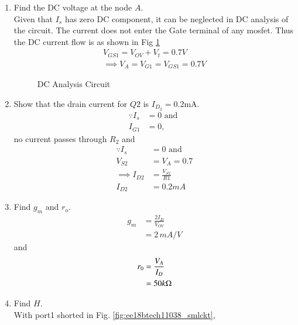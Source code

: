 \begin{enumerate}[label=\arabic*.,ref=\theenumi]
\renewcommand{\thefigure}{\theenumi.\arabic{figure}}
\item Find the DC voltage at the node $A$.
\\
\solution 
Given that $I_{s}$ has zero DC component, it can be neglected in DC analysis of the circuit. The current does not enter the Gate terminal of any mosfet. Thus the DC current flow is as shown in Fig \ref{fig:ee18btech11038_dcckt} 
\begin{align}
    V_{GS1} = V_{OV}  + V_{t} = 0.7V\\
    \implies V_A = V_{G1} = V_{GS1} = 0.7V
    \end{align}
\begin{figure}[!ht]
	\begin{center}
		
		\resizebox{\columnwidth}{!}{}
	\end{center}
\caption{DC Analysis Circuit}
\label{fig:ee18btech11038_dcckt}
\end{figure}
%
\item Show that the drain current for $Q2$ is $I_{D_2} = 0.2$mA.
\\
\solution 
\begin{align}
\because I_s &= 0 \text{ and }
\\
I_{G1} &= 0,
\end{align}
no current passes through $R_2$ and
%
\begin{align}
\because I_s &= 0 \text{ and }
\\
V_{S2} &=V_{A} = 0.7
\\
\implies I_{D2} &= \frac{V_{S2}}{R{1}} 
\\
I_{D2} &= 0.2mA
\end{align}

\item Find $g_{m}$ and $r_{o}$.\\
\solution 
\begin{align}
g_{m} &= \frac{2I_{D}}{V_{OV}} 
\\
 &=2 \, mA/V
\end{align}
and 
\begin{align}
    r_{0} &= \frac{V_{A}}{I_{D}}
\\
 &= 50k\ohm
\end{align}
%
\item Find $H$.
\\
\solution With port1 shorted in Fig. \ref{fig:ee18btech11038_smlckt},
\begin{figure}[!ht]
	\begin{center}
		

\end{center}
\end{figure}
\end{enumerate}
